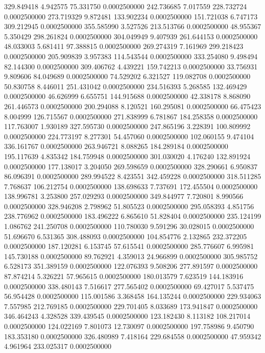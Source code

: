 329.849418 4.942575 75.331750 0.0002500000
242.736685 7.017559 228.732724 0.0002500000
273.719329 9.872481 133.902234 0.0002500000
151.721038 6.747173 309.212945 0.0002500000
355.585990 3.527526 213.513766 0.0002500000
48.955367 5.350429 298.261824 0.0002500000
304.049949 9.407939 261.644153 0.0002500000
48.033003 5.681411 97.388815 0.0002500000
269.274319 7.161969 299.218423 0.0002500000
205.909839 3.957383 114.543544 0.0002500000
333.254080 9.498494 82.144300 0.0002500000
309.406762 4.439221 159.742213 0.0002500000
33.756931 9.809606 84.049689 0.0002500000
74.529202 6.321527 119.082708 0.0002500000
50.830758 8.446011 251.431042 0.0002500000
234.516393 5.268585 132.469429 0.0002500000
46.626999 6.655751 144.915688 0.0002500000
42.338178 8.868090 261.446573 0.0002500000
200.294088 8.120521 160.295081 0.0002500000
66.475423 8.004999 126.715567 0.0002500000
271.838999 6.781867 184.258358 0.0002500000
117.763007 1.930189 327.595730 0.0002500000
247.865196 3.228391 100.809992 0.0002500000
224.773197 8.277301 54.457060 0.0002500000
102.060155 9.474104 336.161767 0.0002500000
263.946721 8.088265 184.289184 0.0002500000
195.117639 4.835342 184.759948 0.0002500000
301.030020 4.176240 132.891924 0.0002500000
177.138017 3.204050 269.598659 0.0002500000
328.290661 6.950837 86.096391 0.0002500000
289.994522 8.423551 342.459228 0.0002500000
318.511285 7.768637 106.212754 0.0002500000
138.698633 7.737691 172.455504 0.0002500000
138.996781 3.253800 257.029293 0.0002500000
349.844977 7.720801 8.990566 0.0002500000
328.946208 2.798962 51.805523 0.0002500000
295.058393 4.851756 238.776962 0.0002500000
183.496222 6.865610 51.828404 0.0002500000
235.124199 1.086762 241.250708 0.0002500000
110.780030 9.591296 30.028015 0.0002500000
51.696670 6.531365 308.488093 0.0002500000
104.854776 2.132865 232.372205 0.0002500000
187.120281 6.153745 57.615541 0.0002500000
285.776607 6.995981 145.730188 0.0002500000
89.762921 4.359013 24.966899 0.0002500000
305.985752 6.528173 351.389159 0.0002500000
122.076393 9.508206 277.891597 0.0002500000
87.874214 5.326221 57.965615 0.0002500000
180.013579 7.623519 144.183916 0.0002500000
338.480143 7.516617 277.565402 0.0002500000
69.427017 5.537475 56.954428 0.0002500000
115.001586 3.368458 164.135244 0.0002500000
229.934063 7.557985 212.769185 0.0002500000
229.701405 8.033689 173.941847 0.0002500000
346.464243 4.328528 339.439545 0.0002500000
123.182430 8.113182 108.217014 0.0002500000
124.022169 7.801073 12.730097 0.0002500000
197.758986 9.450790 183.353180 0.0002500000
326.480989 7.418164 229.684558 0.0002500000
47.959342 4.961964 233.025317 0.0002500000
